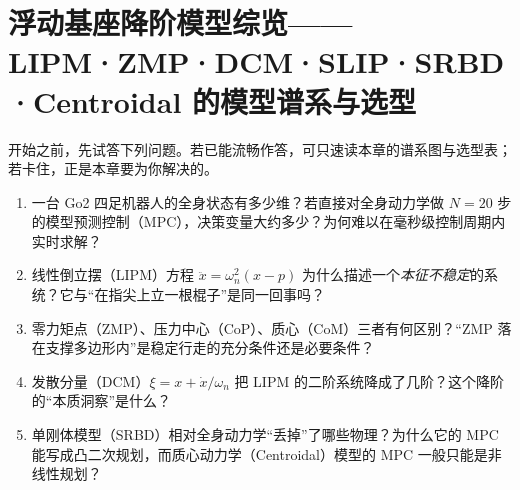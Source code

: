 \chapter{浮动基座降阶模型综览——LIPM·ZMP·DCM·SLIP·SRBD·Centroidal 的模型谱系与选型}
\label{ch:reduced-models}


\begin{practice}[前置自测]
开始之前，先试答下列问题。若已能流畅作答，可只速读本章的谱系图与选型表；若卡住，正是本章要为你解决的。
\begin{enumerate}
  \item 一台 Go2 四足机器人的全身状态有多少维？若直接对全身动力学做 $N=20$ 步的模型预测控制（MPC），决策变量大约多少？为何难以在毫秒级控制周期内实时求解？
  \item 线性倒立摆（LIPM）方程 $\ddot{x}=\omega_n^2(x-p)$ 为什么描述一个\emph{本征不稳定}的系统？它与“在指尖上立一根棍子”是同一回事吗？
  \item 零力矩点（ZMP）、压力中心（CoP）、质心（CoM）三者有何区别？“ZMP 落在支撑多边形内”是稳定行走的充分条件还是必要条件？
  \item 发散分量（DCM）$\xi=x+\dot{x}/\omega_n$ 把 LIPM 的二阶系统降成了几阶？这个降阶的“本质洞察”是什么？
  \item 单刚体模型（SRBD）相对全身动力学“丢掉”了哪些物理？为什么它的 MPC 能写成凸二次规划，而质心动力学（Centroidal）模型的 MPC 一般只能是非线性规划？
\end{enumerate}
\end{practice}

